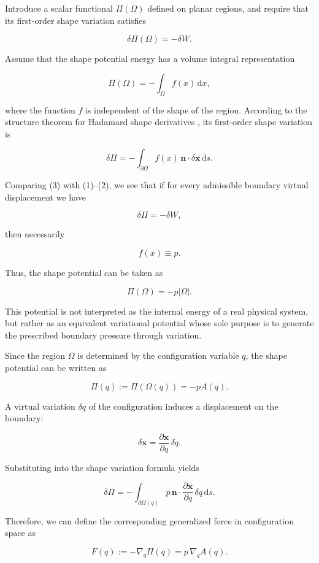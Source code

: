 \documentclass[12pt,a4paper]{article}
\theoremstyle{remark} %
\begin{document}
Introduce a scalar functional $\Pi(\Omega)$ defined on planar regions, and require that its first-order shape variation satisfies

\[
\delta \Pi(\Omega) = - \delta W .
\tag{2}
\]

Assume that the shape potential energy has a volume integral representation

\[
\Pi(\Omega)
=
- \int_{\Omega} f(x) \, \mathrm{d}x ,
\]

where the function $f$ is independent of the shape of the region. According to the structure theorem for Hadamard shape derivatives \cite{hadamard1923}, its first-order shape variation is

\[
\delta \Pi
=
- \int_{\partial \Omega}
f(x)\, \mathbf{n}\cdot \delta \mathbf{x} \, \mathrm{d}s .
\tag{3}
\]

Comparing (3) with (1)--(2), we see that if for every admissible boundary virtual displacement we have

\[
\delta \Pi = - \delta W ,
\]

then necessarily

\[
f(x) \equiv p .
\]

Thus, the shape potential can be taken as

\[
\Pi(\Omega) = - p |\Omega| .
\]

This potential is not interpreted as the internal energy of a real physical system, but rather as an equivalent variational potential whose sole purpose is to generate the prescribed boundary pressure through variation.

Since the region $\Omega$ is determined by the configuration variable $q$, the shape potential can be written as

\[
\Pi(q) := \Pi(\Omega(q)) = - p A(q) .
\]

A virtual variation $\delta q$ of the configuration induces a displacement on the boundary:

\[
\delta \mathbf{x}
=
\frac{\partial \mathbf{x}}{\partial q} \, \delta q .
\]

Substituting into the shape variation formula yields

\[
\delta \Pi
=
- \int_{\partial \Omega(q)}
p \,
\mathbf{n}\cdot
\frac{\partial \mathbf{x}}{\partial q}
\, \delta q \, \mathrm{d}s .
\]

Therefore, we can define the corresponding generalized force in configuration space as

\[
F(q)
:=
- \nabla_q \Pi(q)
=
p \, \nabla_q A(q) .
\]
\end{document}
